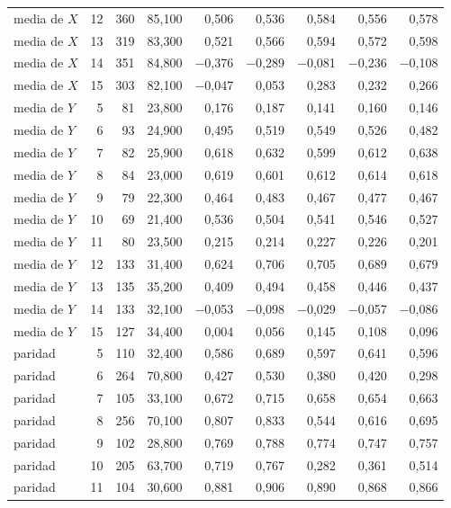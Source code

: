 \begin{table}[htbp]
{\begin{tabular}{@{}lrrrrrrrr@{}}
        media de $X$ & 12 & 360 & 85,100 & 0,506 & 0,536 & 0,584 & 0,556 & 0,578 \\
        media de $X$ & 13 & 319 & 83,300 & 0,521 & 0,566 & 0,594 & 0,572 & 0,598 \\
        media de $X$ & 14 & 351 & 84,800 & $-$0,376 & $-$0,289 & $-$0,081 & $-$0,236 & $-$0,108 \\
        media de $X$ & 15 & 303 & 82,100 & $-$0,047 & 0,053 & 0,283 & 0,232 & 0,266 \\
        media de $Y$ & 5 & 81 & 23,800 & 0,176 & 0,187 & 0,141 & 0,160 & 0,146 \\
        media de $Y$ & 6 & 93 & 24,900 & 0,495 & 0,519 & 0,549 & 0,526 & 0,482 \\
        media de $Y$ & 7 & 82 & 25,900 & 0,618 & 0,632 & 0,599 & 0,612 & 0,638 \\
        media de $Y$ & 8 & 84 & 23,000 & 0,619 & 0,601 & 0,612 & 0,614 & 0,618 \\
        media de $Y$ & 9 & 79 & 22,300 & 0,464 & 0,483 & 0,467 & 0,477 & 0,467 \\
        media de $Y$ & 10 & 69 & 21,400 & 0,536 & 0,504 & 0,541 & 0,546 & 0,527 \\
        media de $Y$ & 11 & 80 & 23,500 & 0,215 & 0,214 & 0,227 & 0,226 & 0,201 \\
        media de $Y$ & 12 & 133 & 31,400 & 0,624 & 0,706 & 0,705 & 0,689 & 0,679 \\
        media de $Y$ & 13 & 135 & 35,200 & 0,409 & 0,494 & 0,458 & 0,446 & 0,437 \\
        media de $Y$ & 14 & 133 & 32,100 & $-$0,053 & $-$0,098 & $-$0,029 & $-$0,057 & $-$0,086 \\
        media de $Y$ & 15 & 127 & 34,400 & 0,004 & 0,056 & 0,145 & 0,108 & 0,096 \\
        paridad & 5 & 110 & 32,400 & 0,586 & 0,689 & 0,597 & 0,641 & 0,596 \\
        paridad & 6 & 264 & 70,800 & 0,427 & 0,530 & 0,380 & 0,420 & 0,298 \\
        paridad & 7 & 105 & 33,100 & 0,672 & 0,715 & 0,658 & 0,654 & 0,663 \\
        paridad & 8 & 256 & 70,100 & 0,807 & 0,833 & 0,544 & 0,616 & 0,695 \\
        paridad & 9 & 102 & 28,800 & 0,769 & 0,788 & 0,774 & 0,747 & 0,757 \\
        paridad & 10 & 205 & 63,700 & 0,719 & 0,767 & 0,282 & 0,361 & 0,514 \\
        paridad & 11 & 104 & 30,600 & 0,881 & 0,906 & 0,890 & 0,868 & 0,866 \\

\end{tabular}}
\end{table}
